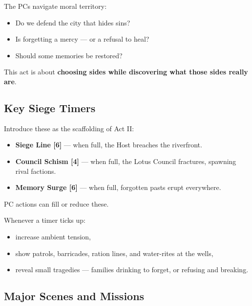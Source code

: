 \documentclass[11pt]{article}
\newcommand{\Term}[1]{\textbf{#1}}
\begin{document}
The PCs navigate moral territory:
\begin{itemize}[leftmargin=*]
  \item Do we defend the city that hides sins?
  \item Is forgetting a mercy --- or a refusal to heal?
  \item Should some memories be restored?
\end{itemize}

This act is about \textbf{choosing sides while discovering what those sides really are}.

\bigskip

\subsection*{Key Siege Timers}

Introduce these as the scaffolding of Act II:

\begin{itemize}[leftmargin=*]
  \item \Term{Siege Line [6]} --- when full, the Host breaches the riverfront.
  \item \Term{Council Schism [4]} --- when full, the Lotus Council fractures, spawning rival factions.
  \item \Term{Memory Surge [6]} --- when full, forgotten pasts erupt everywhere.
\end{itemize}

PC actions can fill or reduce these.

\begin{tcolorbox}[title=\textbf{Siege Pressure Effects},colback=red!5!white,colframe=red!70!black,breakable]
Whenever a timer ticks up:
\begin{itemize}
  \item increase ambient tension,
  \item show patrols, barricades, ration lines, and water-rites at the wells,
  \item reveal small tragedies --- families drinking to forget, or refusing and breaking.
\end{itemize}
\end{tcolorbox}

\bigskip

\subsection*{Major Scenes and Missions}
\end{document}
